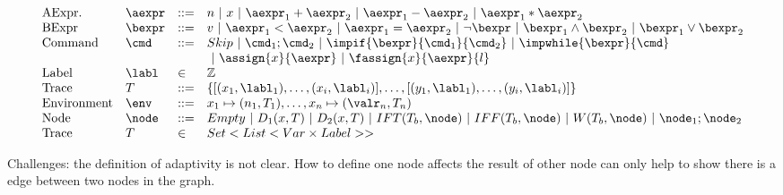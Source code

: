 

\[\begin{array}{llll}
\mbox{AExpr.} & \aexpr & ::= & n~|~ x ~|~ \aexpr_1 + \aexpr_2  ~|~  \aexpr_1 -
                            \aexpr_2 ~|~ \aexpr_1 * \aexpr_2 \\
%
\mbox{BExpr} & \bexpr & ::= & v ~|~  \aexpr_1 < \aexpr_2 ~|~ \aexpr_1
                              = \aexpr_2 ~|~ \neg \bexpr ~|~ \bexpr_1
                              \land \bexpr_2 ~|~ \bexpr_1 \lor \bexpr_2
\\
  \mbox{Command} & \cmd& ::= & Skip ~|~ \cmd_1 ; \cmd_2 ~|~ \impif{\bexpr}{\cmd_1}{\cmd_2}
                               ~|~             \impwhile{\bexpr}{\cmd}  \\
              &&& ~|~\assign{x}{\aexpr} ~|~ \fassign{x}{\aexpr}{l}  
    \\
    \mbox{Label}  & \labl & \in &  \mathbb{Z} \\
    \mbox{Trace} & T & ::= &   \{  [(x_1,\labl_1),\dots, (x_i,
                             \labl_i)],  \dots,  [(y_1,\labl_1),\dots, (y_i,
                             \labl_i)]  \}    \\
\mbox{Environment} & \env & ::= & x_1 \mapsto (n_1, T_1),
                                  \ldots, x_n \mapsto
                                  (\valr_n,T_n) \\
    \mbox{Node}  & \node & ::=&  Empty ~|~D_1(x, T) ~|~ D_2(x,T) ~|~ IFT(T_b, \node) ~|~
                                IFF(T_b, \node) ~|~ W (T_b, \node)
                                ~|~ \node_1 ; \node_2\\
                                  \mbox{Trace} & T & \in  & Set <
                                                            List<Var
                                                            \times Label> >
\end{array}\]


Challenges:  the definition of adaptivity is not clear. How to define one node affects the result of other node can only help to show there is a edge between two nodes in the graph.    




